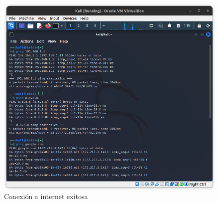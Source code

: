 \documentclass{article}
\begin{document}
        \begin{figure}[!htbp]
            \centering
            \includegraphics[scale=0.3]{img/all-internet.png}
            \caption{Conexión a internet exitosa}
            \label{fig:all-internet}
        \end{figure}
        
    \clearpage
    
    
\end{document}
